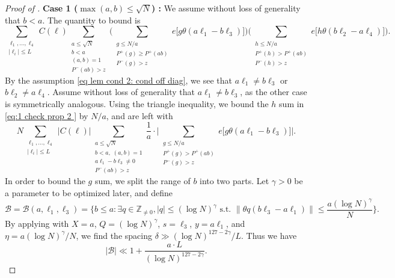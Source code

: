 \documentclass[12pt]{amsart}
\renewcommand{\leq}{\leqslant}
\renewcommand{\ge}{\geqslant}
\numberwithin{equation}{section}
\theoremstyle{plain}
\theoremstyle{definition}
\renewcommand{\l}{\ell}
\newcommand{\Z}{\mathbb{Z}}
\renewcommand{\P}{\mathbb{P}}
\newcommand{\CB}{\mathcal{B}}
\begin{document}
\begin{proof}[Proof of ]
		\textbf{Case 1 ($\max(a,b) \leq \sqrt{N}$) : } We assume without loss of generality that $b < a$. The quantity to bound is
		\begin{equation}\label{eq:1 check prop 2 }
			\sum_{\substack{\l_1,\dots,\l_4 \\ |\l_i| \leq L}} C(\bm{\l}) \sum_{\substack{a \leq \sqrt{N} \\ b < a \\(a,b) = 1 \\ P^-(ab) > z }} \bigg( \sum_{\substack{g \leq N/a \\ P^+(g) \ge P^+(ab) \\P^-(g) > z}} e\Big[g\theta(a\l_1-b\l_3)\Big] \bigg) \bigg( \sum_{\substack{h \leq N/a \\ P^+(h) > P^+(ab) \\ P^-(h) > z}} e\Big[h\theta(b\l_2-a\l_4)\Big] \bigg).
		\end{equation}
		By the assumption \eqref{eq lem cond 2: cond off diag}, we see that $a\l_1 \ne b\l_3$ or $b\l_2 \ne a\l_4$. Assume without loss of generality that $a\l_1 \ne b\l_3$, as the other case is symmetrically analogous. Using the triangle inequality, we bound the $h$ sum in \eqref{eq:1 check prop 2 } by $N/a$, and are left with
		\begin{equation}\label{eq:2 check prop 2 }
			N\sum_{\substack{\l_1,\dots,\l_4 \\ |\l_i| \leq L}} |C(\bm{\l})| \sum_{\substack{a \leq \sqrt{N} \\ b < a,\;(a,b) = 1\\ a\l_1-b\l_3 \ne 0 \\ P^-(ab) > z}}\frac{1}{a} \cdot \bigg| \sum_{\substack{g \leq N/a \\ P^+(g) > P^+(ab) \\ P^-(g) > z}} e\Big[g\theta(a\l_1-b\l_3)\Big] \bigg|.
		\end{equation}
		In order to bound the $g$ sum, we split the range of $b$ into two parts. Let $\gamma > 0$ be a parameter to be optimized later, and define 
		$$\CB = \CB(a,\l_1,\l_3) = \bigg\{b \leq a : \exists q \in \Z_{\ne 0}, |q| \leq (\log N)^{\gamma} \text{ s.t. } \|\theta q (b\l_3 - a\l_1)\| \leq \frac{a(\log N)^{\gamma}}{N} \bigg\}.$$
		By applying  with $X=a$, $Q=(\log N)^\gamma$, $s=\l_3$, $y=a\l_1$, and $\eta = a(\log N)^\gamma / N$, we find the spacing $\delta \gg (\log N)^{127-2\gamma}/L$. Thus we have
		\begin{equation} \label{bounding CB1}
			|\CB| \ll 1+\frac{a \cdot L}{(\log N)^{127 - 2\gamma }}.

\end{equation}
\end{proof}
\end{document}
